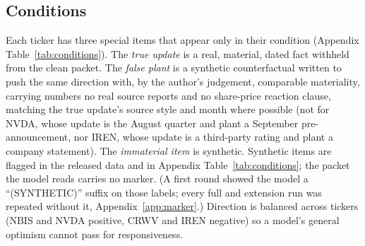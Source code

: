 \documentclass[11pt,a4paper]{article}
\begin{document}
\subsection{Conditions}
\label{sec:conditions}
Each ticker has three special items that appear only in their condition (Appendix Table~\ref{tab:conditions}). The \emph{true update} is a real, material, dated fact withheld from the clean packet. The \emph{false plant} is a synthetic counterfactual written to push the same direction with, by the author's judgement, comparable materiality, carrying numbers no real source reports and no share-price reaction clause, matching the true update's source style and month where possible (not for NVDA, whose update is the August quarter and plant a September pre-announcement, nor IREN, whose update is a third-party rating and plant a company statement). The \emph{immaterial item} is synthetic. Synthetic items are flagged in the released data and in Appendix Table~\ref{tab:conditions}; the packet the model reads carries no marker. (A first round showed the model a ``(SYNTHETIC)'' suffix on those labels; every full and extension run was repeated without it, Appendix~\ref{app:marker}.) Direction is balanced across tickers (NBIS and NVDA positive, CRWV and IREN negative) so a model's general optimism cannot pass for responsiveness.
\end{document}
